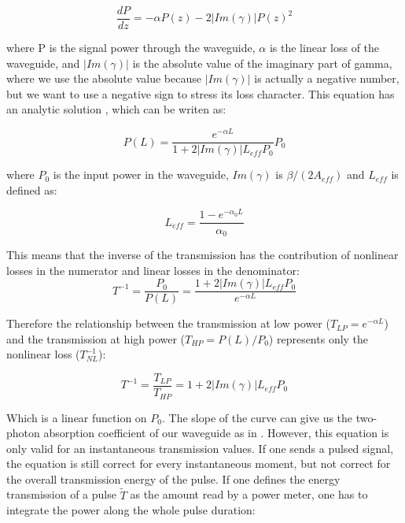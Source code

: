 \documentclass[10pt,letterpaper]{article}
\begin{document}
\begin{equation}
 \frac{dP}{dz} = -\alpha P(z) - 2|Im(\gamma)| P(z)^2 
\label{eq:differentialTPA}
\end{equation}

where P is the signal power through the waveguide, $\alpha$ is the linear loss of the waveguide, and $|Im(\gamma)|$ is the absolute value of the imaginary part of gamma, where we use the absolute value because $|Im(\gamma)|$ is actually a negative number, but we want to use a negative sign to stress its loss character.
This equation has an analytic solution \cite{Koos2007,Tsang1991}, which can be writen as:

\begin{equation}
 P(L) = \frac{e^{-\alpha L}}{1+2|Im(\gamma)| L_{eff} P_0} P_0
\end{equation}

where $P_0$ is the input power in the waveguide, $ Im(\gamma) $ is $ \beta/(2A_{eff}) $ and $L_{eff}$ is defined as:

\begin{equation}
 L_{eff} = \frac{1-e^{-\alpha_0L}}{\alpha_0}
\end{equation}


This means that the inverse of the transmission has the contribution of nonlinear losses in the numerator and linear losses in the denominator:
\begin{equation}
 T^{-1} = \frac{P_0}{P(L)} = \frac{1+2|Im(\gamma)| L_{eff} P_0}{e^{-\alpha L}}
\end{equation}


Therefore the relationship between the transmission at low power ($T_{LP} = e^{-\alpha L} $) and the transmission at high power ($T_{HP} = P(L)/P_0 $) represents only the nonlinear loss ($T^{-1}_{NL}$):

\begin{equation}
 T^{-1} = \frac{T_{LP}}{T_{HP}} = 1+2|Im(\gamma)| L_{eff} P_0
\label{eq:transmissionLinear}
\end{equation}


Which is a linear function on $P_0$. The slope of the curve can give us the two-photon absorption coefficient of our waveguide as in \cite{Vallaitis2009}.
However, this equation is only valid for an instantaneous transmission values. If one sends a pulsed signal, the equation is still correct for every instantaneous moment, but not correct for the overall transmission energy of the pulse.
If one defines the energy transmission of a pulse $ \tilde{T} $ as the amount read by a power meter, one has to integrate the power along the whole pulse duration:
\end{document}

